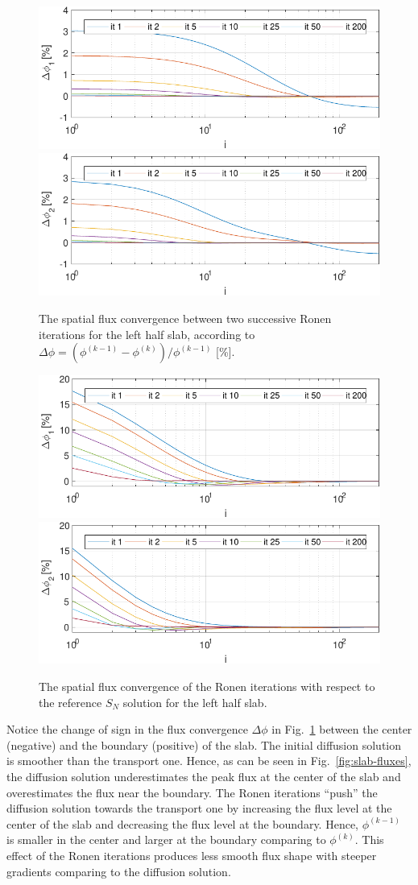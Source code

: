 \begin{figure}[h!]
	\centering
	\includegraphics[width=0.48\linewidth]{flux_deviation_half_it_1.pdf}
	\includegraphics[width=0.48\linewidth]{flux_deviation_half_it_2.pdf}
	\caption{The spatial flux convergence between two successive Ronen iterations for the left half slab, according to $\Delta\phi = (\phi^{(k-1)}-\phi^{(k)})/\phi^{(k-1)}$ [\%].}
	\label{fig:conv2}
\end{figure}

\begin{figure}[htbp!]
	\centering
	\includegraphics[width=0.48\linewidth]{flux_deviation_half_it_1_sn.pdf}
	\includegraphics[width=0.48\linewidth]{flux_deviation_half_it_2_sn.pdf}
	\caption{The spatial flux convergence of the Ronen iterations with respect to the reference $S_N$ solution for the left half slab.}
	\label{fig:conv3}
\end{figure}

Notice the change of sign in the flux convergence $\Delta \phi$ in Fig.~\ref{fig:conv2} between the center (negative) and the boundary (positive) of the slab. The initial diffusion solution is smoother than the transport one. Hence, as can be seen in Fig.~\ref{fig:slab-fluxes}, the diffusion solution underestimates the peak flux at the center of the slab and overestimates the flux near the boundary. The Ronen iterations ``push'' the diffusion solution towards the transport one by increasing the flux level at the center of the slab and decreasing the flux level at the boundary. Hence, $\phi^{(k-1)}$ is smaller in the center and larger at the boundary comparing to $\phi^{(k)}$. This effect of the Ronen iterations produces less smooth flux shape with steeper gradients comparing to the diffusion solution.
%
